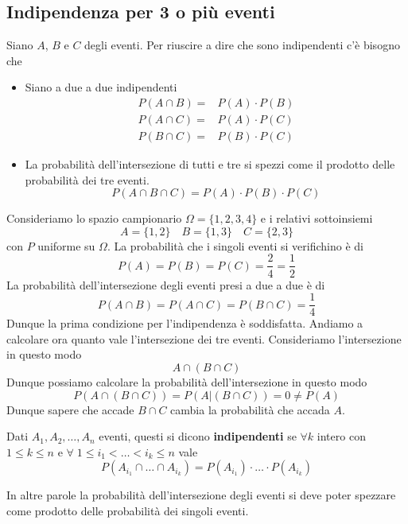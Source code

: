 \subsection{Indipendenza per 3 o più eventi}
Siano $A$, $B$ e $C$ degli eventi. Per riuscire a dire che sono indipendenti c'è bisogno che
\begin{itemize}
	\item Siano a due a due indipendenti
	      \begin{align*}
		      P(A \cap B) = & P(A) \cdot P(B) \\
		      P(A \cap C) = & P(A) \cdot P(C) \\
		      P(B \cap C) = & P(B) \cdot P(C)
	      \end{align*}
	\item La probabilità dell'intersezione di tutti e tre si spezzi come il prodotto delle
	      probabilità dei tre eventi.
	      \[ P(A \cap B \cap C) = P(A) \cdot P(B) \cdot P(C) \]
\end{itemize}

\begin{example}
	Consideriamo lo spazio campionario $\Omega=\{ 1,2,3,4 \}$ e i relativi sottoinsiemi
	\[ A=\{ 1, 2 \} \quad B=\{ 1, 3 \} \quad C=\{ 2, 3 \} \]
	con $P$ uniforme su $\Omega$. La probabilità che i singoli eventi si verifichino è di
	\[ P(A) = P(B) = P(C) = \frac{2}{4} = \frac{1}{2} \]
	La probabilità dell'intersezione degli eventi presi a due a due è di
	\[ P(A \cap B) = P(A \cap C) = P(B \cap C) = \frac{1}{4} \]
	Dunque la prima condizione per l'indipendenza è soddisfatta. Andiamo a calcolare ora quanto
	vale l'intersezione dei tre eventi. Consideriamo l'intersezione in questo modo
	\[ A \cap (B \cap C) \]
	Dunque possiamo calcolare la probabilità dell'intersezione in questo modo
	\[ P(A \cap (B \cap C)) = P(A | (B \cap C)) = 0 \neq P(A) \]
	Dunque sapere che accade $B \cap C$ cambia la probabilità che accada $A$.
\end{example}

\begin{definition}
	Dati $A_1, A_2, \dots, A_n$ eventi, questi si dicono \textbf{indipendenti} se $\forall k$
	intero con $1 \leq k \leq n$ e $\forall \; 1 \leq i_1 < \dots < i_k \leq n$ vale
	\[ P(A_{i_1} \cap \dots \cap A_{i_k}) = P(A_{i_1}) \cdot \dots \cdot P(A_{i_k}) \]
\end{definition}

In altre parole la probabilità dell'intersezione degli eventi si deve poter spezzare come
prodotto delle probabilità dei singoli eventi.

